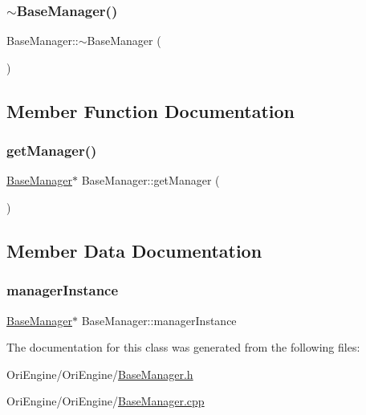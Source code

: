 \hypertarget{class_base_manager_af512e2d3b2a7727a2766a6c95a6b90a3}{}\label{class_base_manager_af512e2d3b2a7727a2766a6c95a6b90a3} 
\subsubsection{\texorpdfstring{$\sim$\+Base\+Manager()}{~BaseManager()}}
{\footnotesize\ttfamily Base\+Manager\+::$\sim$\+Base\+Manager (\begin{DoxyParamCaption}{ }\end{DoxyParamCaption})}



\subsection{Member Function Documentation}
\hypertarget{class_base_manager_af85c9b7676acfa30dd14e5f7a878c3fa}{}\label{class_base_manager_af85c9b7676acfa30dd14e5f7a878c3fa} 
\subsubsection{\texorpdfstring{get\+Manager()}{getManager()}}
{\footnotesize\ttfamily \hyperlink{class_base_manager}{Base\+Manager}$\ast$ Base\+Manager\+::get\+Manager (\begin{DoxyParamCaption}{ }\end{DoxyParamCaption})}



\subsection{Member Data Documentation}
\hypertarget{class_base_manager_ae53c7fd979ff30128ef75bafe87a2ee8}{}\label{class_base_manager_ae53c7fd979ff30128ef75bafe87a2ee8} 
\subsubsection{\texorpdfstring{manager\+Instance}{managerInstance}}
{\footnotesize\ttfamily \hyperlink{class_base_manager}{Base\+Manager}$\ast$ Base\+Manager\+::manager\+Instance\hspace{0.3cm}{\ttfamily [private]}}



The documentation for this class was generated from the following files\+:\begin{DoxyCompactItemize}
\item 
Ori\+Engine/\+Ori\+Engine/\hyperlink{_base_manager_8h}{Base\+Manager.\+h}\item 
Ori\+Engine/\+Ori\+Engine/\hyperlink{_base_manager_8cpp}{Base\+Manager.\+cpp}\end{DoxyCompactItemize}
